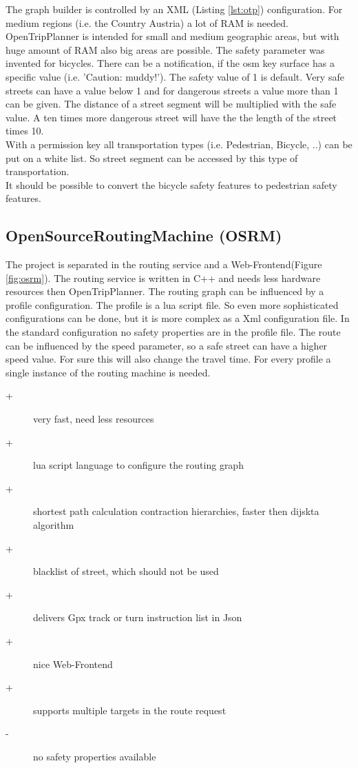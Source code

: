 \documentclass{sig-alternate}
\begin{document}
 The graph builder is controlled by an XML (Listing \ref{lst:otp}) configuration. For medium regions (i.e. the Country Austria) a lot of RAM is needed. OpenTripPlanner is intended for small and medium geographic areas, but with huge amount of RAM also big areas are possible. The safety parameter was invented for bicycles. There can be a notification, if the osm key surface  has a specific value (i.e. 'Caution: muddy!'). The safety value of 1 is default. Very safe streets can have a value below 1 and for dangerous streets a value more than 1 can be given. The distance of a street segment will be multiplied with the safe value. A ten times more dangerous street will have the the length of the street times 10. \\
 With a permission key all transportation types (i.e. Pedestrian, Bicycle, ..) can be put on a white list. So street segment can be accessed by this type of transportation. \\
 It should be possible to convert the bicycle safety features to pedestrian safety features.
 



\subsection{OpenSourceRoutingMachine (OSRM)}
The project is separated in the routing service and a Web-Frontend(Figure \ref{fig:osrm}). The routing service is written in C++ and needs less hardware resources then OpenTripPlanner. The routing graph can be influenced by a profile configuration. The profile is a lua script file. So even more sophisticated configurations can be done, but it is more complex as a Xml configuration file. In the standard configuration no safety properties are in the profile file. The route can be influenced by the speed parameter, so a safe street can have a higher speed value. For sure this will also change the travel time. For every profile a single instance of the routing machine is needed.  \\
\begin{description}
\item[+]very fast\cite{luxen-vetter-2011}, need less resources
\item[+]lua script language to configure the routing graph 
\item[+]shortest path calculation contraction hierarchies, faster then dijskta algorithm
\item[+]blacklist of street, which should not be used
\item[+]delivers Gpx track or turn instruction list in Json
\item[+]nice Web-Frontend
\item[+]supports multiple targets in the route request
\item[-]no safety properties available
\end{description}
\end{document}
